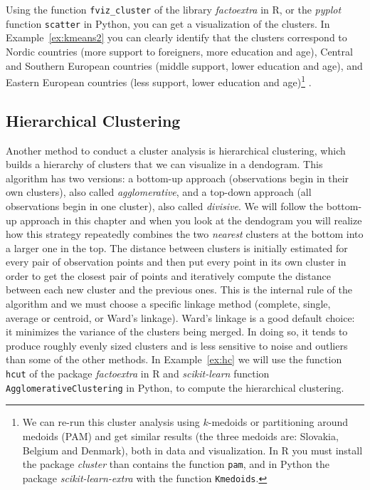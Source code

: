 Using the function \texttt{fviz\_cluster} of the library \emph{factoextra} in R, or the \emph{pyplot} function \texttt{scatter} in Python, you can get a visualization of the clusters. In Example~\ref{ex:kmeans2} you can clearly identify that the clusters correspond to Nordic countries (more support to foreigners, more education and age), Central and Southern European countries (middle support, lower education and age), and Eastern European countries (less support, lower education and age)\footnote{We can re-run this cluster analysis using $k$-medoids or partitioning around medoids (PAM) and get similar results (the three medoids are: Slovakia,  Belgium and Denmark), both in data and visualization. In R you must install the package \emph{cluster} than contains the function \texttt{pam}, and in Python the package \emph{scikit-learn-extra} with the function \texttt{Kmedoids}.} .



\subsection{Hierarchical Clustering}

Another method to conduct a cluster analysis is hierarchical clustering, which builds a hierarchy of clusters that we can visualize in a dendogram.  This algorithm has two versions: a bottom-up approach (observations begin in their own clusters), also called \textit{agglomerative}, and a top-down approach (all observations begin in one cluster), also called \textit{divisive}. We will follow the bottom-up approach in this chapter and when you  look at the dendogram you will realize how this strategy repeatedly combines the two \textit{nearest} clusters at the bottom into a larger one in the top. The distance between clusters is initially estimated for every pair of observation points and then put every point in its own cluster in order to get the closest pair of points and iteratively compute the distance between each new cluster and the previous ones. This is the internal rule of the algorithm and we must choose a specific linkage method (complete, single, average or centroid, or Ward's linkage). Ward's linkage is a good default choice: it minimizes the variance of the clusters being merged. In doing so, it tends to produce roughly evenly sized clusters and is less sensitive to noise and outliers than some of the other methods.
In Example~\ref{ex:hc} we will use the function \texttt{hcut} of the package \emph{factoextra} in R and \emph{scikit-learn} function \texttt{AgglomerativeClustering} in Python, to compute the hierarchical clustering.

